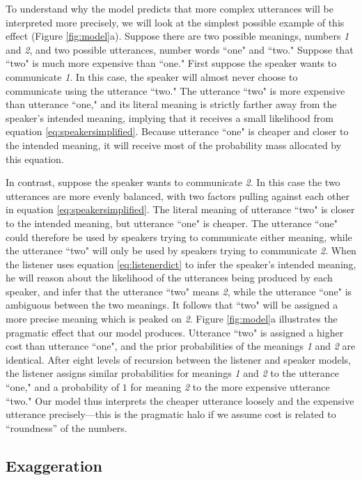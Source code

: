 \documentclass{article} %
\begin{document}
To understand why the model predicts that more complex utterances will be interpreted more precisely, we will look at the simplest possible example of this effect (Figure \ref{fig:model}a). Suppose there are two possible meanings, numbers \emph{1} and \emph{2}, and two possible utterances, number words ``one" and ``two." Suppose that ``two" is much more expensive than ``one." First suppose the speaker wants to communicate \emph{1}. In this case, the speaker will almost never choose to communicate using the utterance ``two." The utterance ``two" is more expensive than utterance ``one," and its literal meaning is strictly farther away from the speaker's intended meaning, implying that it receives a small likelihood from equation \ref{eq:speakersimplified}. Because utterance ``one" is cheaper and closer to the intended meaning, it will receive most of the probability mass allocated by this equation.

In contrast, suppose the speaker wants to communicate \emph{2}. In this case the two utterances are more evenly balanced, with two factors pulling against each other in equation \ref{eq:speakersimplified}. The literal meaning of utterance ``two" is closer to the intended meaning, but utterance ``one" is cheaper. The utterance ``one" could therefore be used by speakers trying to communicate either meaning, while the utterance ``two" will only be used by speakers trying to communicate \emph{2}. When the listener uses equation \ref{eq:listenerdict} to infer the speaker's intended meaning, he will reason about the likelihood of the utterances being produced by each speaker, and infer that the utterance ``two" means \emph{2}, while the utterance ``one"  is ambiguous between the two meanings. It follows that ``two" will be assigned a more precise meaning which is peaked on \emph{2}.  Figure \ref{fig:model}a illustrates the pragmatic effect that our model produces. Utterance ``two" is assigned a higher cost than utterance ``one", and the prior probabilities of the meanings \emph{1} and \emph{2} are identical. After eight levels of recursion between the listener and speaker models, the listener assigns similar probabilities for meanings \emph{1} and \emph{2} to the utterance ``one," and a probability of $1$ for meaning \emph{2} to the more expensive utterance ``two." Our model thus interprets the cheaper utterance loosely and the expensive utterance precisely---this is the pragmatic halo if we assume cost is related to ``roundness'' of the numbers.


\subsection{Exaggeration}
\end{document}
